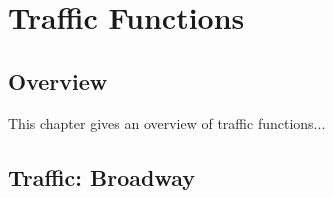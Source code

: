 \nwenddocs{}\part{Traffic Functions}
\label{part-traffic}

\chapter{Overview}
\label{traffic-overview}

This chapter gives an overview of traffic functions...

\nwenddocs{}\chapter{Traffic: Broadway}

